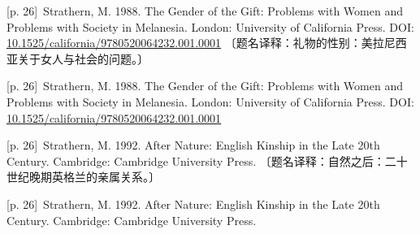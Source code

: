 \documentclass[10pt,a4paper]{article}
\begin{document}
\noindent\begin{minipage}{\textwidth}\begin{minipage}[t]{\dimexpr.5\textwidth-4mm\relax}\noindent\begin{minipage}[t]{\linewidth}{\scriptsize\color{gray} [p. 26]}\ Strathern, M. 1988. The Gender of the Gift: Problems with Women and Problems with Society in Melanesia. London: University of California Press. DOI: \url{10.1525/california/9780520064232.001.0001} 〔题名译释：礼物的性别：美拉尼西亚关于女人与社会的问题。〕\par\end{minipage}\par\end{minipage}\hfill\begin{minipage}[t]{\dimexpr.5\textwidth-4mm\relax}\noindent\begin{minipage}[t]{\linewidth}{\scriptsize\color{gray} [p. 26]}\ Strathern, M. 1988. The Gender of the Gift: Problems with Women and Problems with Society in Melanesia. London: University of California Press. DOI: \url{10.1525/california/9780520064232.001.0001}\par\end{minipage}\par\end{minipage}\end{minipage}\par
\noindent\begin{minipage}{\textwidth}\begin{minipage}[t]{\dimexpr.5\textwidth-4mm\relax}\noindent\begin{minipage}[t]{\linewidth}{\scriptsize\color{gray} [p. 26]}\ Strathern, M. 1992. After Nature: English Kinship in the Late 20th Century. Cambridge: Cambridge University Press. 〔题名译释：自然之后：二十世纪晚期英格兰的亲属关系。〕\par\end{minipage}\par\end{minipage}\hfill\begin{minipage}[t]{\dimexpr.5\textwidth-4mm\relax}\noindent\begin{minipage}[t]{\linewidth}{\scriptsize\color{gray} [p. 26]}\ Strathern, M. 1992. After Nature: English Kinship in the Late 20th Century. Cambridge: Cambridge University Press.\par\end{minipage}\par\end{minipage}\end{minipage}\par
\end{document}
